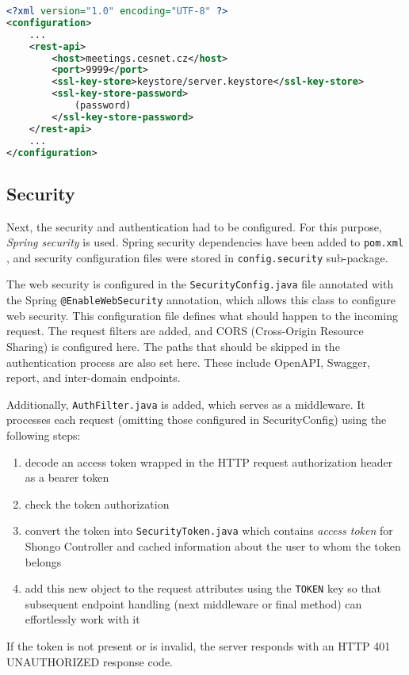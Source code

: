 \begin{lstlisting}[language=XML, caption=REST configuration example, label=conf]
<?xml version="1.0" encoding="UTF-8" ?>
<configuration>
    ...
    <rest-api>
        <host>meetings.cesnet.cz</host>
        <port>9999</port>
        <ssl-key-store>keystore/server.keystore</ssl-key-store>
        <ssl-key-store-password>
            (password)
        </ssl-key-store-password>
    </rest-api>
    ...
</configuration>
\end{lstlisting}

\subsection{Security}
Next, the security and authentication had to be configured. For this purpose, \emph{Spring security} is used. Spring security dependencies have been added to \texttt{pom.xml} , and security configuration files were stored in \texttt{config.security} sub-package.

The web security is configured in the \texttt{SecurityConfig.java} file annotated with the Spring \texttt{@EnableWebSecurity} annotation, which allows this class to configure web security\cite{springdocumentation}.
This configuration file defines what should happen to the incoming request. The request filters are added, and CORS (Cross-Origin Resource Sharing) is configured here. The paths that should be skipped in the authentication process are also set here. These include OpenAPI, Swagger, report, and inter-domain\cite{pavelka2016shongo} endpoints.

Additionally, \texttt{AuthFilter.java} is added, which serves as a middleware. It processes each request (omitting those configured in SecurityConfig) using the following steps:
\begin{enumerate}
    \item decode an access token wrapped in the HTTP request authorization header as a bearer token
    \item check the token authorization
    \item convert the token into \texttt{SecurityToken.java} which contains \emph{access token} for Shongo Controller and cached information about the user to whom the token belongs
    \item add this new object to the request attributes using the \texttt{TOKEN} key so that subsequent endpoint handling (next middleware or final method) can effortlessly work with it
\end{enumerate}
If the token is not present or is invalid, the server responds with an HTTP 401 UNAUTHORIZED response code.


